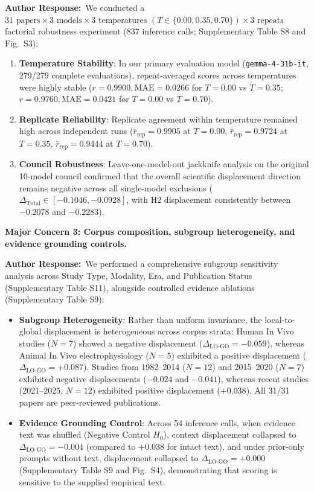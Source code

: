 \documentclass[11pt]{article}
\newcommand{\reviewercomment}[1]{\vspace{1em}\noindent\textbf{\color{blue!80!black}#1}\vspace{0.4em}}
\newcommand{\authorsresponse}{\noindent\textbf{\color{black}Author Response:}\ }
\begin{document}
\authorsresponse We conducted a $31\text{ papers} \times 3\text{ models} \times 3\text{ temperatures } (T \in \{0.00, 0.35, 0.70\}) \times 3\text{ repeats}$ factorial robustness experiment (837 inference calls; Supplementary Table S8 and Fig.~S3):
\begin{enumerate}[leftmargin=*,noitemsep]
\item \textbf{Temperature Stability}: In our primary evaluation model (\texttt{gemma-4-31b-it}, 279/279 complete evaluations), repeat-averaged scores across temperatures were highly stable ($r = 0.9900, \text{MAE} = 0.0266$ for $T=0.00$ vs $T=0.35$; $r = 0.9760, \text{MAE} = 0.0421$ for $T=0.00$ vs $T=0.70$).
\item \textbf{Replicate Reliability}: Replicate agreement within temperature remained high across independent runs ($\bar{r}_{\text{rep}} = 0.9905$ at $T=0.00$, $\bar{r}_{\text{rep}} = 0.9724$ at $T=0.35$, $\bar{r}_{\text{rep}} = 0.9444$ at $T=0.70$).
\item \textbf{Council Robustness}: Leave-one-model-out jackknife analysis on the original 10-model council confirmed that the overall scientific displacement direction remains negative across all single-model exclusions ($\Delta_{\text{Total}} \in [-0.1046, -0.0928]$, with H2 displacement consistently between $-0.2078$ and $-0.2283$).
\end{enumerate}

\reviewercomment{Major Concern 3: Corpus composition, subgroup heterogeneity, and evidence grounding controls.}

\authorsresponse We performed a comprehensive subgroup sensitivity analysis across Study Type, Modality, Era, and Publication Status (Supplementary Table S11), alongside controlled evidence ablations (Supplementary Table S9):
\begin{itemize}[leftmargin=*,noitemsep]
\item \textbf{Subgroup Heterogeneity}: Rather than uniform invariance, the local-to-global displacement is heterogeneous across corpus strata: Human In Vivo studies ($N=7$) showed a negative displacement ($\Delta_{\text{LO-GO}} = -0.059$), whereas Animal In Vivo electrophysiology ($N=5$) exhibited a positive displacement ($\Delta_{\text{LO-GO}} = +0.087$). Studies from 1982--2014 ($N=12$) and 2015--2020 ($N=7$) exhibited negative displacements ($-0.024$ and $-0.041$), whereas recent studies (2021--2025, $N=12$) exhibited positive displacement ($+0.038$). All 31/31 papers are peer-reviewed publications.
\item \textbf{Evidence Grounding Control}: Across 54 inference calls, when evidence text was shuffled (Negative Control $H_0$), context displacement collapsed to $\Delta_{\text{LO-GO}} = -0.004$ (compared to $+0.038$ for intact text), and under prior-only prompts without text, displacement collapsed to $\Delta_{\text{LO-GO}} = +0.000$ (Supplementary Table S9 and Fig.~S4), demonstrating that scoring is sensitive to the supplied empirical text.
\end{itemize}
\end{document}
